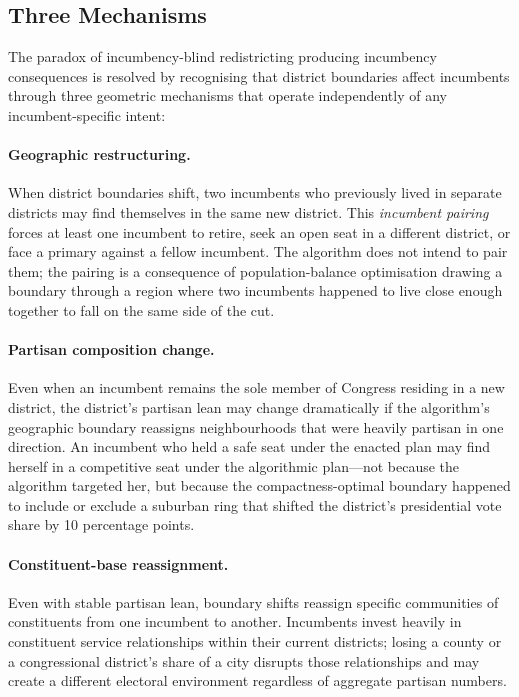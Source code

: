 \subsection{Three Mechanisms}

The paradox of incumbency-blind redistricting producing incumbency consequences is
resolved by recognising that district boundaries affect incumbents through three
geometric mechanisms that operate independently of any incumbent-specific intent:

\paragraph{Geographic restructuring.}
When district boundaries shift, two incumbents who previously lived in separate districts
may find themselves in the same new district. This \textit{incumbent pairing} forces at
least one incumbent to retire, seek an open seat in a different district, or face a
primary against a fellow incumbent. The algorithm does not intend to pair them; the
pairing is a consequence of population-balance optimisation drawing a boundary through
a region where two incumbents happened to live close enough together to fall on the
same side of the cut.

\paragraph{Partisan composition change.}
Even when an incumbent remains the sole member of Congress residing in a new district,
the district's partisan lean may change dramatically if the algorithm's geographic
boundary reassigns neighbourhoods that were heavily partisan in one direction. An
incumbent who held a safe seat under the enacted plan may find herself in a competitive
seat under the algorithmic plan---not because the algorithm targeted her, but because
the compactness-optimal boundary happened to include or exclude a suburban ring that
shifted the district's presidential vote share by 10 percentage points.

\paragraph{Constituent-base reassignment.}
Even with stable partisan lean, boundary shifts reassign specific communities of
constituents from one incumbent to another. Incumbents invest heavily in constituent
service relationships within their current districts; losing a county or a congressional
district's share of a city disrupts those relationships and may create a different
electoral environment regardless of aggregate partisan numbers.

